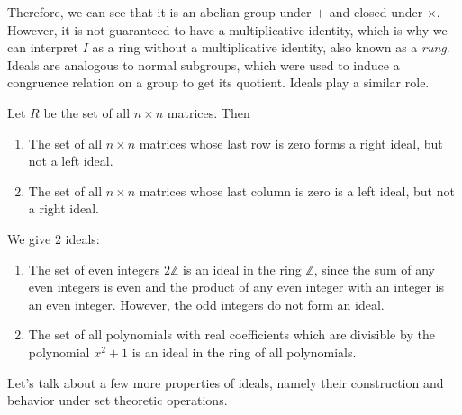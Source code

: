  Therefore, we can see that it is an abelian group under $+$ and closed under $\times$. However, it is not guaranteed to have a multiplicative identity, which is why we can interpret $I$ as a ring without a multiplicative identity, also known as a \textit{rung}. Ideals are analogous to normal subgroups, which were used to induce a congruence relation on a group to get its quotient. Ideals play a similar role. 

  \begin{example}
    Let $R$ be the set of all $n \times n$ matrices. Then 
    \begin{enumerate}
      \item The set of all $n \times n$ matrices whose last row is zero forms a right ideal, but not a left ideal.
      \item The set of all $n\times n$ matrices whose last column is zero is a left ideal, but not a right ideal. 
    \end{enumerate}
  \end{example}

  \begin{example}
    We give 2 ideals: 
    \begin{enumerate}
      \item The set of even integers $2 \mathbb{Z}$ is an ideal in the ring $\mathbb{Z}$, since the sum of any even integers is even and the product of any even integer with an integer is an even integer. However, the odd integers do not form an ideal. 
      \item The set of all polynomials with real coefficients which are divisible by the polynomial $x^2 + 1$ is an ideal in the ring of all polynomials. 
    \end{enumerate}
  \end{example}

  Let's talk about a few more properties of ideals, namely their construction and behavior under set theoretic operations. 

